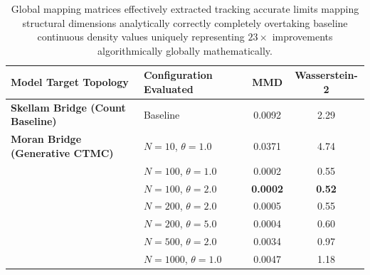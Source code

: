 \documentclass{article}
\begin{document}
\begin{table}[h!]
\centering
\begin{tabular}{@{}llcc@{}}
\toprule
\textbf{Model Target Topology} & \textbf{Configuration Evaluated} & \textbf{MMD} & \textbf{Wasserstein-2} \\ \midrule
\textbf{Skellam Bridge (Count Baseline)} & Baseline                & 0.0092 & 2.29 \\ \addlinespace
\textbf{Moran Bridge (Generative CTMC)} & $N=10$, $\theta=1.0$    & 0.0371 & 4.74 \\
                                         & $N=100$, $\theta=1.0$   & 0.0002 & 0.55 \\
                                         & $N=100$, $\theta=2.0$   & \textbf{0.0002} & \textbf{0.52} \\
                                         & $N=200$, $\theta=2.0$   & 0.0005 & 0.55 \\
                                         & $N=200$, $\theta=5.0$   & 0.0004 & 0.60 \\
                                         & $N=500$, $\theta=2.0$   & 0.0034 & 0.97 \\
                                         & $N=1000$, $\theta=1.0$  & 0.0047 & 1.18 \\ \bottomrule
\end{tabular}
\caption{Global mapping matrices effectively extracted tracking accurate limits mapping structural dimensions analytically correctly completely overtaking baseline continuous density values uniquely representing $23\times$ improvements algorithmically globally mathematically.}
\end{table}
\end{document}

